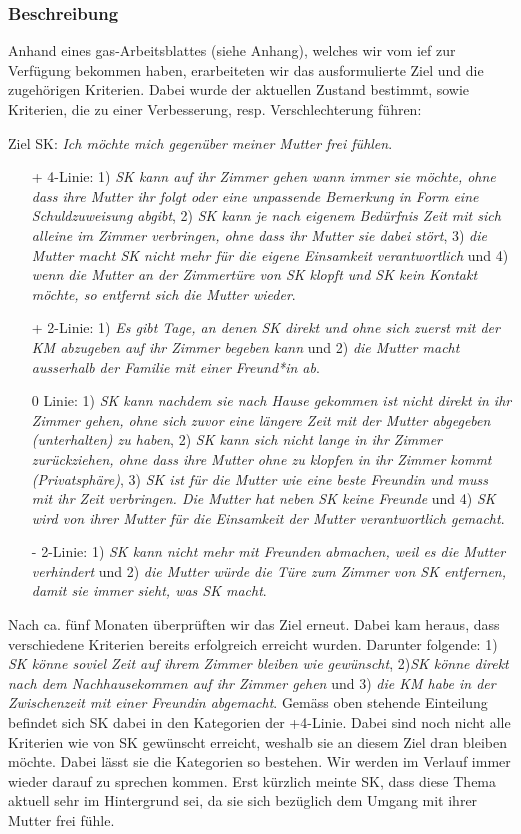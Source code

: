 \subsubsection{Beschreibung}
Anhand eines \ac{gas}-Arbeitsblattes (siehe Anhang), welches wir vom \ac{ief} zur Verfügung bekommen haben, erarbeiteten wir das ausformulierte Ziel und die zugehörigen Kriterien. Dabei wurde der aktuellen Zustand bestimmt, sowie Kriterien, die zu einer Verbesserung, resp. Verschlechterung führen:

Ziel SK: \textit{Ich möchte mich gegenüber meiner Mutter frei fühlen}.
\begin{itemize}
   \item[+] 4-Linie: 1) \textit{SK kann auf ihr Zimmer gehen wann immer sie möchte, ohne dass ihre Mutter ihr folgt oder eine unpassende Bemerkung in Form eine Schuldzuweisung abgibt}, 2) \textit{SK kann je nach eigenem Bedürfnis Zeit mit sich alleine im Zimmer verbringen, ohne dass ihr Mutter sie dabei stört}, 3) \textit{die Mutter macht SK nicht mehr für die eigene Einsamkeit verantwortlich} und 4) \textit{wenn die Mutter an der Zimmertüre von SK klopft und SK kein Kontakt möchte, so entfernt sich die Mutter wieder}.
   \item[+] 2-Linie: 1) \textit{Es gibt Tage, an denen SK direkt und ohne sich zuerst mit der KM abzugeben auf ihr Zimmer begeben kann} und 2) \textit{die Mutter macht ausserhalb der Familie mit einer Freund*in ab}.
  \item[0] Linie: 1) \textit{SK kann nachdem sie nach Hause gekommen ist nicht direkt in ihr Zimmer gehen, ohne sich zuvor eine längere Zeit mit der Mutter abgegeben (unterhalten) zu haben}, 2) \textit{SK kann sich nicht lange in ihr Zimmer zurückziehen, ohne dass ihre Mutter ohne zu klopfen in ihr Zimmer kommt (Privatsphäre)}, 3) \textit{SK ist für die Mutter wie eine beste Freundin und muss mit ihr Zeit verbringen. Die Mutter hat neben SK keine Freunde} und 4) \textit{SK wird von ihrer Mutter für die Einsamkeit der Mutter verantwortlich gemacht}.
 \item[-] 2-Linie: 1) \textit{SK kann nicht mehr mit Freunden abmachen, weil es die Mutter verhindert} und 2) \textit{die Mutter würde die Türe zum Zimmer von SK entfernen, damit sie immer sieht, was SK macht}.
\end{itemize}
Nach ca. fünf Monaten überprüften wir das Ziel erneut. Dabei kam heraus, dass verschiedene Kriterien bereits erfolgreich erreicht wurden. Darunter folgende: 1) \textit{SK könne soviel Zeit auf ihrem Zimmer bleiben wie gewünscht}, 2)\textit{SK könne direkt nach dem Nachhausekommen auf ihr Zimmer gehen} und 3) \textit{die KM habe in der Zwischenzeit mit einer Freundin abgemacht}. Gemäss oben stehende Einteilung befindet sich SK dabei in den Kategorien der +4-Linie. Dabei sind noch nicht alle Kriterien wie von SK gewünscht erreicht, weshalb sie an diesem Ziel dran bleiben möchte. Dabei lässt sie die Kategorien so bestehen. Wir werden im Verlauf immer wieder darauf zu sprechen kommen. Erst kürzlich meinte SK, dass diese Thema aktuell sehr im Hintergrund sei, da sie sich bezüglich dem Umgang mit ihrer Mutter frei fühle. 


